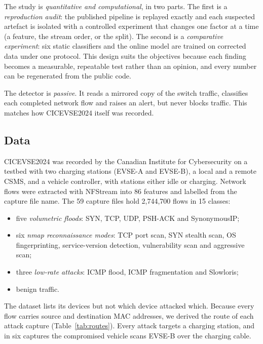 \documentclass[conference]{IEEEtran}
\begin{document}
The study is \emph{quantitative and computational}, in two parts. The first is a \emph{reproduction audit}: the published pipeline is replayed exactly and each suspected artefact is isolated with a controlled experiment that changes one factor at a time (a feature, the stream order, or the split). The second is a \emph{comparative experiment}: six static classifiers and the online model are trained on corrected data under one protocol. This design suits the objectives because each finding becomes a measurable, repeatable test rather than an opinion, and every number can be regenerated from the public code.

The detector is \emph{passive}. It reads a mirrored copy of the switch traffic, classifies each completed network flow and raises an alert, but never blocks traffic. This matches how CICEVSE2024 itself was recorded.

\subsection{Data}

CICEVSE2024 \cite{b8} was recorded by the Canadian Institute for Cybersecurity on a testbed with two charging stations (EVSE-A and EVSE-B), a local and a remote CSMS, and a vehicle controller, with stations either idle or charging. Network flows were extracted with NFStream into 86 features and labelled from the capture file name. The 59 capture files hold 2,744,700 flows in 15 classes:
\begin{itemize}
    \item five \emph{volumetric floods}: SYN, TCP, UDP, PSH-ACK and SynonymousIP;
    \item six \emph{nmap reconnaissance modes}: TCP port scan, SYN stealth scan, OS fingerprinting, service-version detection, vulnerability scan and aggressive scan;
    \item three \emph{low-rate attacks}: ICMP flood, ICMP fragmentation and Slowloris;
    \item benign traffic.
\end{itemize}

The dataset lists its devices but not which device attacked which. Because every flow carries source and destination MAC addresses, we derived the route of each attack capture (Table~\ref{tab:routes}). Every attack targets a charging station, and in six captures the compromised vehicle scans EVSE-B over the charging cable.
\end{document}
